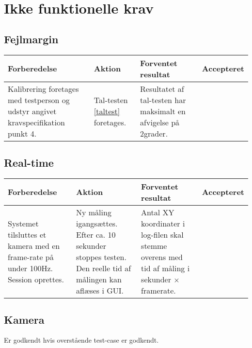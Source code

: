 \documentclass[accepttest.tex]{subfiles}
\begin{document}
\section{Ikke funktionelle krav}

\subsection{Fejlmargin}
\begin{table}[H]
	\small
	\begin{tabular}{|p{3.5cm}|p{3.5cm}|p{3.5cm}|l|}
	\hline Forberedelse & Aktion & Forventet resultat & Accepteret \\ 
	\hline Kalibrering foretages med testperson og udstyr angivet kravspecifikation punkt 4. & Tal-testen \ref{taltest} foretages. &Resultatet af tal-testen har  maksimalt en afvigelse på 2grader.   & \\
	
	\hline 
\end{tabular} 
\end{table}
	
\subsection{Real-time}
\begin{table}[H]
	\small
	\begin{tabular}{|p{3.5cm}|p{3.5cm}|p{3.5cm}|l|}
		\hline Forberedelse & Aktion & Forventet resultat & Accepteret \\ 
		\hline Systemet tilsluttes et kamera med en frame-rate på under 100Hz.  Session oprettes.& Ny måling igangsættes. Efter ca. 10 sekunder stoppes testen. Den reelle tid af målingen kan aflæses i GUI. & Antal XY koordinater i log-filen skal stemme overens med tid af måling i sekunder $ \times $ framerate. & \\
		
		\hline 
	\end{tabular} 
\end{table}
	
\subsection{Kamera}
Er godkendt hvis overstående test-case er godkendt. 
	
\end{document}
